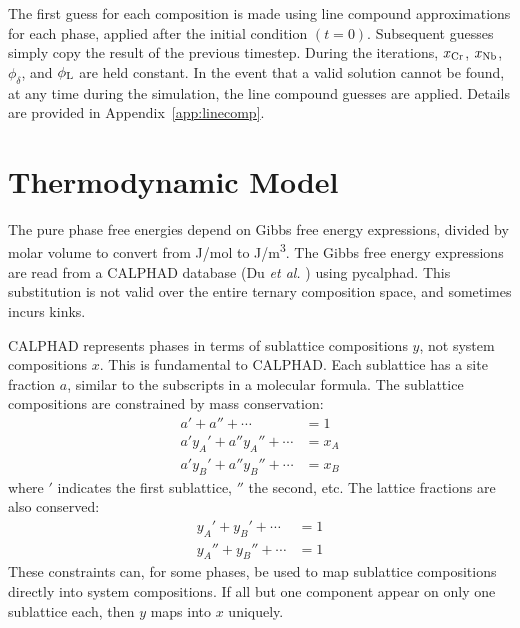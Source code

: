\documentclass[10pt]{article}
\begin{document}
		The first guess for each composition is made using line compound approximations for each phase,
		applied after the initial condition $(t=0)$.
		Subsequent guesses simply copy the result of the previous timestep.
		During the iterations, $x_{\ce{Cr}}$,
		                       $x_{\ce{Nb}}$,
		                       $\phi_{\delta}$, and
		                       $\phi_{\ce{L}}$ are held constant.
		In the event that a valid solution cannot be found, at any time during the simulation,
		the line compound guesses are applied.
		Details are provided in Appendix~\ref{app:linecomp}.

	



	\section{Thermodynamic Model}
		The pure phase free energies depend on Gibbs free energy expressions, divided by molar volume to convert from \si{\joule/\mole} to \si{\joule/\cubic\meter}.
		The Gibbs free energy expressions are read from a CALPHAD database (Du \emph{et al.} \cite{Du2005}) using pycalphad.
		This substitution is not valid over the entire ternary composition space, and sometimes incurs kinks.

		CALPHAD represents phases in terms of sublattice compositions $y$, not system compositions $x$.
		This is fundamental to CALPHAD.
		Each sublattice has a site fraction $a$, similar to the subscripts in a molecular formula.
		The sublattice compositions are constrained by mass conservation:
		\begin{align}
			a' + a'' + \cdots &= 1\\\nonumber
			a'y_A' + a''y_A'' + \cdots &= x_A\\\label{eqn:sublattice}
			a'y_B' + a''y_B'' + \cdots &= x_B
		\end{align}
		where $'$ indicates the first sublattice, $''$ the second, etc.
		The lattice fractions are also conserved:
		\begin{align}\nonumber
			y_A' + y_B' + \cdots &= 1\\
			y_A'' + y_B'' + \cdots &= 1
		\end{align}
		These constraints can, for some phases, be used to map sublattice compositions directly into system compositions.
		If all but one component appear on only one sublattice each, then $y$ maps into $x$ uniquely.
\end{document}
